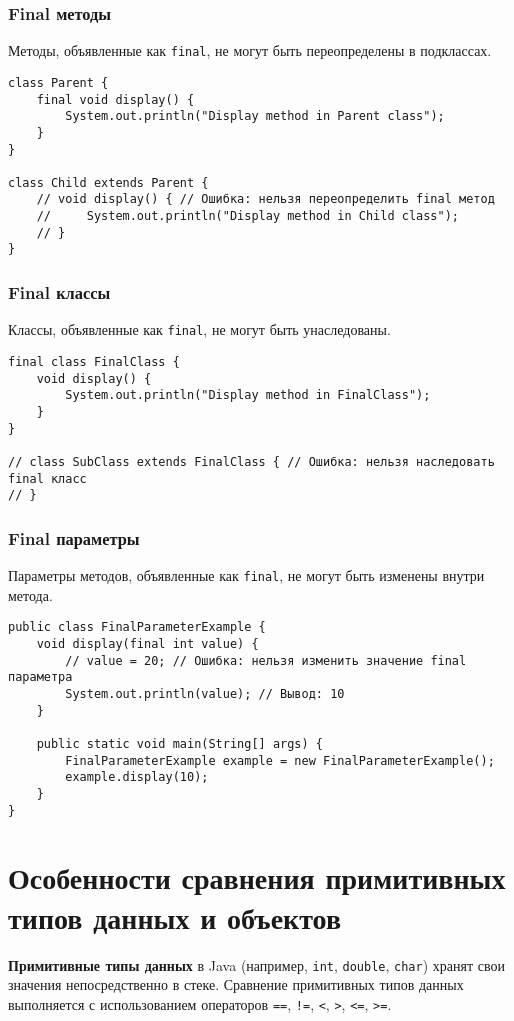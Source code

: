 \documentclass[12pt, a4paper]{article}
\begin{document}
\subsubsection*{Final методы}
Методы, объявленные как \texttt{final}, не могут быть переопределены в подклассах.

\begin{verbatim}
class Parent {
    final void display() {
        System.out.println("Display method in Parent class");
    }
}

class Child extends Parent {
    // void display() { // Ошибка: нельзя переопределить final метод
    //     System.out.println("Display method in Child class");
    // }
}
\end{verbatim}

\subsubsection*{Final классы}
Классы, объявленные как \texttt{final}, не могут быть унаследованы.

\begin{verbatim}
final class FinalClass {
    void display() {
        System.out.println("Display method in FinalClass");
    }
}

// class SubClass extends FinalClass { // Ошибка: нельзя наследовать final класс
// }
\end{verbatim}

\subsubsection*{Final параметры}
Параметры методов, объявленные как \texttt{final}, не могут быть изменены внутри метода.

\begin{verbatim}
public class FinalParameterExample {
    void display(final int value) {
        // value = 20; // Ошибка: нельзя изменить значение final параметра
        System.out.println(value); // Вывод: 10
    }

    public static void main(String[] args) {
        FinalParameterExample example = new FinalParameterExample();
        example.display(10);
    }
}
\end{verbatim}


\section{Особенности сравнения примитивных типов данных и объектов}
\textbf{Примитивные типы данных} в Java (например, \texttt{int}, \texttt{double}, \texttt{char}) хранят свои значения непосредственно в стеке. Сравнение примитивных типов данных выполняется с использованием операторов \texttt{==}, \texttt{!=}, \texttt{<}, \texttt{>}, \texttt{<=}, \texttt{>=}.
\end{document}
